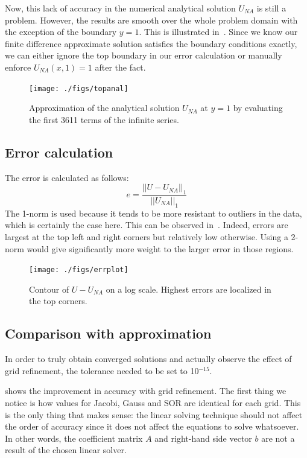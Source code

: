 \documentclass{SelimArticle}
\begin{document}
Now, this lack of accuracy in the numerical analytical solution $U_{NA}$ is still a problem. However,
the results are smooth over the whole problem domain with the exception of the boundary $y = 1$. This is
illustrated in~. Since we know our finite difference approximate solution satisfies
the boundary conditions exactly, we can either ignore the top boundary in our error calculation or
manually enforce $U_{NA}(x,1) = 1$ after the fact.

\begin{figure}
    \centering
    \texttt{[image: ./figs/topanal]}
    \caption{Approximation of the analytical solution $U_{NA}$ at $y = 1$ by evaluating
        the first 3611 terms of the infinite series.}\label{fig:topanal}
\end{figure}

\subsection{Error calculation}
\newcommand{\norm}[1]{\big|\big|#1\big|\big|}
The error is calculated as follows:
$$
e = \frac{\norm{U - U_{NA}}_1}{\norm{U_{NA}}_1}
$$
The 1-norm is used because it tends to be more resistant to outliers in the data, which is certainly the case
here. This can be observed in~. Indeed, errors are largest at the top left and right corners
but relatively low otherwise. Using a 2-norm would give significantly more weight to the larger error in those
regions.
\begin{figure}[H]
    \centering
    \texttt{[image: ./figs/errplot]}
    \caption{Contour of $U - U_{NA}$ on a log scale. Highest errors are localized in the top corners.}
    \label{fig:errplot}
\end{figure}

\subsection{Comparison with approximation}
In order to truly obtain converged solutions and actually observe the effect of grid refinement, the tolerance
needed to be set to 10$^{-15}$.

 shows the improvement in accuracy with grid refinement. The first thing we notice
is how values for Jacobi, Gauss and SOR are identical for each grid. This is the only thing that makes sense:
the linear solving technique should not affect the order of accuracy since it does not affect the equations
to solve whatsoever.
In other words, the coefficient matrix $A$ and right-hand side vector $b$ are not a result of the chosen
linear solver.
\end{document}
